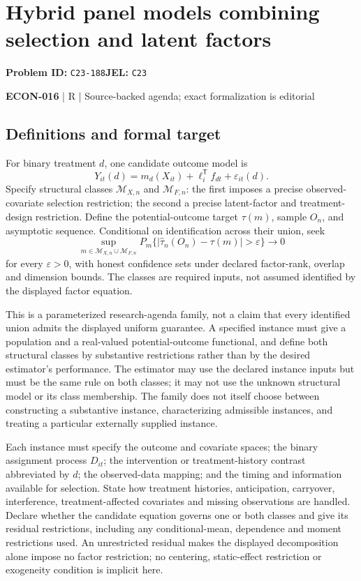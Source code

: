 \documentclass[11pt,a4paper]{article}
\begin{document}
\section*{Hybrid panel models combining selection and latent factors}
\textbf{Problem ID:} \texttt{C23-188}\quad \textbf{JEL:} \texttt{C23}\par
\label{problem:OP-0601}


\label{audited:ECON-016}

{\sffamily\small\color{muted}\textbf{ECON-016} | R | Source-backed agenda; exact formalization is editorial\par}

\subsection*{Definitions and formal target}

For binary treatment \(d\), one candidate outcome model is
\[
 Y_{it}(d)=m_d(X_{it})+\ell_i^{\mathsf T}f_{dt}+\varepsilon_{it}(d).
\]
Specify structural classes \(\mathcal M_{X,n}\) and \(\mathcal M_{F,n}\): the first imposes a precise observed-covariate selection restriction; the second a precise latent-factor and treatment-design restriction. Define the potential-outcome target \(\tau(m)\), sample \(O_n\), and asymptotic sequence. Conditional on identification across their union, seek
\[
 \sup_{m\in\mathcal M_{X,n}\cup\mathcal M_{F,n}}
 P_m\{|\widehat\tau_n(O_n)-\tau(m)|>\varepsilon\}\longrightarrow0
\]
for every \(\varepsilon>0\), with honest confidence sets under declared factor-rank, overlap and dimension bounds. The classes are required inputs, not assumed identified by the displayed factor equation.

This is a parameterized research-agenda family, not a claim that every identified union admits the displayed uniform guarantee. A specified instance must give a population and a real-valued potential-outcome functional, and define both structural classes by substantive restrictions rather than by the desired estimator's performance. The estimator may use the declared instance inputs but must be the same rule on both classes; it may not use the unknown structural model or its class membership. The family does not itself choose between constructing a substantive instance, characterizing admissible instances, and treating a particular externally supplied instance.

Each instance must specify the outcome and covariate spaces; the binary assignment process \(D_{it}\); the intervention or treatment-history contrast abbreviated by \(d\); the observed-data mapping; and the timing and information available for selection. State how treatment histories, anticipation, carryover, interference, treatment-affected covariates and missing observations are handled. Declare whether the candidate equation governs one or both classes and give its residual restrictions, including any conditional-mean, dependence and moment restrictions used. An unrestricted residual makes the displayed decomposition alone impose no factor restriction; no centering, static-effect restriction or exogeneity condition is implicit here.
\end{document}
